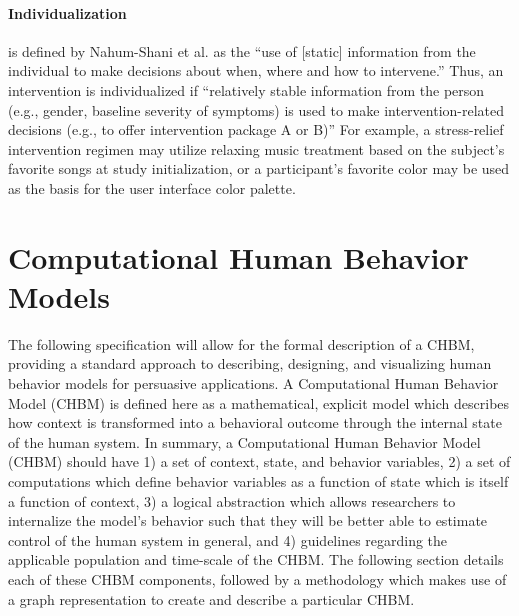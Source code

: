 \documentclass[runningheads,a4paper]{llncs}
\begin{document}
\paragraph{Individualization} is defined by Nahum-Shani et al. as the ``use of [static] information from the individual to make decisions about when, where and how to intervene.'' \cite{nahum2014}
Thus, an intervention is individualized if ``relatively stable information from the person (e.g., gender, baseline severity of symptoms) is used to make intervention-related decisions (e.g., to offer intervention package A or B)'' \cite{nahum2014}
For example, a stress-relief intervention regimen may utilize relaxing music treatment based on the subject's favorite songs at study initialization, or a participant's favorite color may be used as the basis for the user interface color palette.


\section{Computational Human Behavior Models}
The following specification will allow for the formal description of a CHBM, providing a standard approach to describing, designing, and visualizing human behavior models for persuasive applications.
A Computational Human Behavior Model (CHBM) is defined here as a mathematical, explicit model which describes how context is transformed into a behavioral outcome through the internal state of the human system.
In summary, a Computational Human Behavior Model (CHBM) should have 1) a set of context, state, and behavior variables, 2) a set of computations which define behavior variables as a function of state which is itself a function of context, 3) a logical abstraction which allows researchers to internalize the model's behavior such that they will be better able to estimate control of the human system in general, and 4) guidelines regarding the applicable population and time-scale of the CHBM.
The following section details each of these CHBM components, followed by a methodology which makes use of a graph representation to create and describe a particular CHBM.
\end{document}

